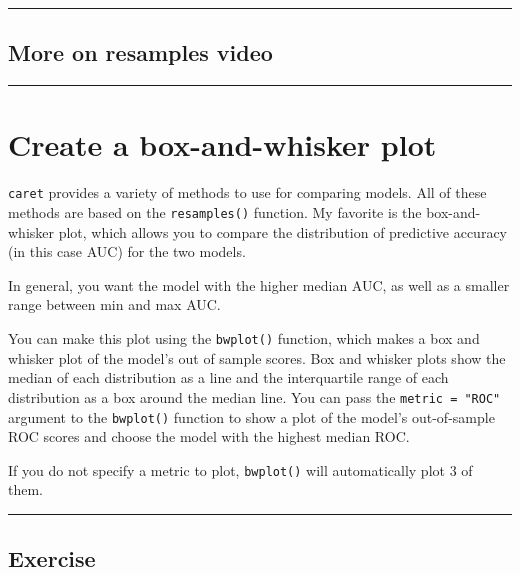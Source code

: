 \documentclass[
]{book}
\begin{document}
\begin{center}\rule{0.5\linewidth}{0.5pt}\end{center}

\hypertarget{more-on-resamples-video}{%
\subsection*{More on resamples video}\label{more-on-resamples-video}}

\begin{center}\rule{0.5\linewidth}{0.5pt}\end{center}

\hypertarget{create-a-box-and-whisker-plot}{%
\section{Create a box-and-whisker plot}\label{create-a-box-and-whisker-plot}}

\texttt{caret} provides a variety of methods to use for comparing models. All of these methods are based on the \texttt{resamples()} function. My favorite is the box-and-whisker plot, which allows you to compare the distribution of predictive accuracy (in this case AUC) for the two models.

In general, you want the model with the higher median AUC, as well as a smaller range between min and max AUC.

You can make this plot using the \texttt{bwplot()} function, which makes a box and whisker plot of the model's out of sample scores. Box and whisker plots show the median of each distribution as a line and the interquartile range of each distribution as a box around the median line. You can pass the \texttt{metric\ =\ "ROC"} argument to the \texttt{bwplot()} function to show a plot of the model's out-of-sample ROC scores and choose the model with the highest median ROC.

If you do not specify a metric to plot, \texttt{bwplot()} will automatically plot 3 of them.

\begin{center}\rule{0.5\linewidth}{0.5pt}\end{center}

\hypertarget{exercise-33}{%
\subsection*{Exercise}\label{exercise-33}}
\end{document}
